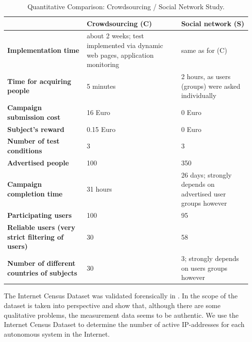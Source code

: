 \begin{table}[tb]
\caption{Quantitative Comparison: Crowdsourcing / Social Network Study.} \label{tab:CvsS}
\begin{center}
{\footnotesize
	\begin{tabular}{|p{}|p{}|p{}|} \hline
		\textbf{} & \textbf{Crowdsourcing (C)} & \textbf{Social network (S)} \\ \hline
		\textbf{Implementation time} & about 2 weeks; test implemented via dynamic web pages, application monitoring & same as for (C) \\ \hline
		\textbf{Time for acquiring people} & 5 minutes & 2 hours, as users (groups) were asked individually \\ \hline
		\textbf{Campaign submission cost} & 16 Euro & 0 Euro \\ \hline
		\textbf{Subject’s reward} & 0.15 Euro & 0 Euro \\ \hline
		\textbf{Number of test conditions} & 3 & 3 \\ \hline
		\textbf{Advertised  people} & 100 & 350 \\ \hline
		\textbf{Campaign completion time} & 31 hours & 26 days; strongly depends on advertised user groups however \\ \hline
		\textbf{Participating users} & 100 & 95 \\ \hline
		\textbf{Reliable users (very strict filtering of users)} & 30 & 58 \\ \hline
		\textbf{Number of different countries of subjects} & 30 & 3; strongly depends on users groups however \\ \hline
		\end{tabular}
}
\end{center}
\end{table}



The Internet Census Dataset was validated forensically in \cite{dainotticaida}.
In \cite{krenc2014internet} the scope of the dataset is taken into perspective and show that, although there are some qualitative problems, the measurement data seems to be authentic.
We use the Internet Census Dataset to determine the number of active IP-addresses for each autonomous system in the Internet.
